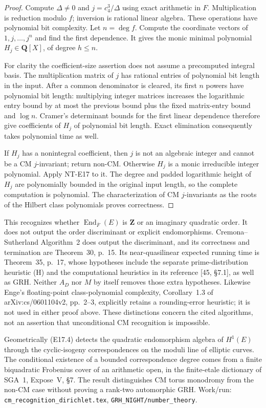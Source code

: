\begin{proof}
Compute $\Delta\ne0$ and $j=c_4^3/\Delta$ using
exact arithmetic in $F$.
Multiplication is reduction modulo $f$;
inversion is rational linear algebra.
These operations have polynomial bit complexity.
Let $n=\deg f$. Compute the coordinate vectors
of $1,j,\ldots,j^n$ and find the first dependence.
It gives the monic minimal polynomial
$H_j\in\mathbf Q[X]$, of degree $h\le n$.

For clarity the coefficient-size assertion does
not assume a precomputed integral basis.
The multiplication matrix of $j$ has rational
entries of polynomial bit length in the input.
After a common denominator is cleared, its first
$n$ powers have polynomial bit length: multiplying
integer matrices increases the logarithmic
entry bound by at most the previous bound plus
the fixed matrix-entry bound and $\log n$.
Cramer's determinant bounds for the first
linear dependence therefore give coefficients
of $H_j$ of polynomial bit length.
Exact elimination consequently takes polynomial
time as well.

If $H_j$ has a nonintegral coefficient, then $j$
is not an algebraic integer and cannot be a
CM $j$-invariant; return non-CM.
Otherwise $H_j$ is a monic irreducible integer
polynomial. Apply NT-E17 to it.
The degree and padded logarithmic height of
$H_j$ are polynomially bounded in the original
input length, so the complete computation is
polynomial. The characterization of CM
$j$-invariants as the roots of the Hilbert class
polynomials proves correctness.
\end{proof}

This recognizes whether
$\operatorname{End}_{\overline F}(E)$ is $\mathbf Z$
or an imaginary quadratic order.
It does not output the order discriminant or
explicit endomorphisms.
Cremona--Sutherland Algorithm~2 does output
the discriminant, and its correctness and
termination are Theorem~30, p.~15.
Its near-quasilinear expected running time is
Theorem~35, p.~17, whose hypotheses include
the separate prime-distribution heuristic (H)
and the computational heuristics in its
reference [45, \S7.1], as well as GRH.
Neither $A_D$ nor $M$ by itself removes those
extra hypotheses.
Likewise Enge's floating-point class-polynomial
complexity, Corollary~1.3 of arXiv:cs/0601104v2,
pp.~2--3, explicitly retains a rounding-error
heuristic; it is not used in either proof above.
These distinctions concern the cited algorithms,
not an assertion that unconditional CM recognition
is impossible.

Geometrically (E17.4) detects the quadratic
endomorphism algebra of $H^1(E)$ through the
cyclic-isogeny correspondences on the moduli
line of elliptic curves. The conditional
existence of a bounded correspondence degree
comes from a finite biquadratic Frobenius cover
of an arithmetic open, in the finite-etale
dictionary of SGA~1, Expose~V, \S7.
The result distinguishes CM torus monodromy
from the non-CM case without proving a
rank-two automorphic GRH.
Work/run: \texttt{cm\_recognition\_dirichlet.tex},
\texttt{GRH\_NIGHT/number\_theory}.
